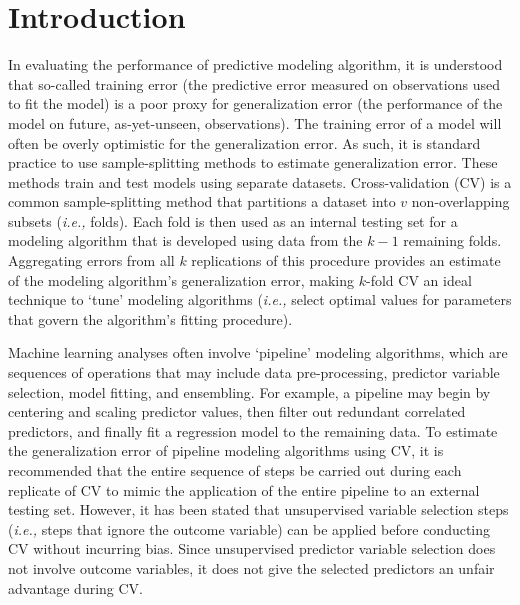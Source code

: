 \documentclass[AMA,STIX1COL,doublespace]{WileyNJD-v2}
\begin{document}
\section{Introduction}

In evaluating the performance of predictive modeling algorithm, it is
understood that so-called training error (the predictive error measured
on observations used to fit the model) is a poor proxy for
generalization error (the performance of the model on future,
as-yet-unseen, observations). The training error of a model will often
be overly optimistic for the generalization error. As such, it is
standard practice to use sample-splitting methods to estimate
generalization error. These methods train and test models using separate
datasets. Cross-validation (CV) is a common sample-splitting method that
partitions a dataset into \(v\) non-overlapping subsets
(\textit{i.e., }folds). Each fold is then used as an internal testing
set for a modeling algorithm that is developed using data from the
\(k-1\) remaining folds. Aggregating errors from all \(k\) replications
of this procedure provides an estimate of the modeling algorithm's
generalization error, making \(k\)-fold CV an ideal technique to `tune'
modeling algorithms (\textit{i.e., }select optimal values for parameters
that govern the algorithm's fitting procedure).

Machine learning analyses often involve `pipeline' modeling algorithms,
which are sequences of operations that may include data pre-processing,
predictor variable selection, model fitting, and ensembling.\citep{mlr3}
For example, a pipeline may begin by centering and scaling predictor
values, then filter out redundant correlated predictors, and finally fit
a regression model to the remaining data. To estimate the generalization
error of pipeline modeling algorithms using CV, it is recommended that
the entire sequence of steps be carried out during each replicate of CV
to mimic the application of the entire pipeline to an external testing
set. However, it has been stated that unsupervised variable selection
steps (\textit{i.e., }steps that ignore the outcome variable) can be
applied before conducting CV without incurring
bias.\citep{hastie2009elements} Since unsupervised predictor variable
selection does not involve outcome variables, it does not give the
selected predictors an unfair advantage during CV.
\end{document}
